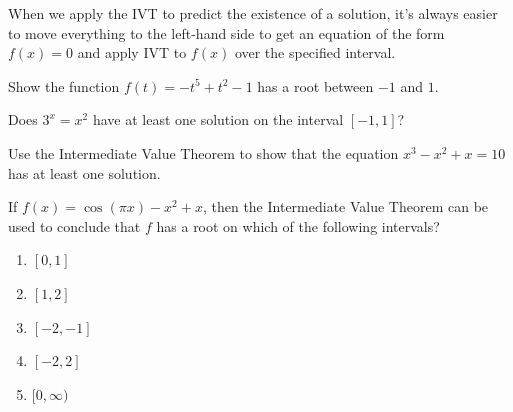 \documentclass[../main.tex]{subfiles}
\begin{document}
When we apply the IVT to predict the existence of a solution, it's always easier to move everything to the left-hand side to get an equation of the form \(f(x) = 0\) and apply IVT to \(f(x)\) over the specified interval.

\begin{example}
  Show the function \(f(t) = -t^{5} + t^{2} - 1\) has a root between \(-1\) and \(1\).
  \blanks*
\end{example}

\begin{exercise}
  Does \(3^{x} = x^{2}\) have at least one solution on the interval \([-1,1]\)?

  \blanks*
\end{exercise}
\clearpage

\begin{exercise}
  Use the Intermediate Value Theorem to show that the equation \(x^{3} - x^{2} + x = 10\) has at least one solution.

  \blanks*
\end{exercise}

\begin{exercise}
  If \(f(x) = \cos(\pi x) - x^{2} + x\), then the Intermediate Value Theorem can be used to conclude that \(f\) has a root on which of the following intervals?

  \begin{enumerate}[label={\Alph*.}]
    \item \([0, 1]\)
    \item \([1, 2]\)
    \item \([-2, -1]\)
    \item \([-2,  2]\)
    \item \([0, \infty)\)
  \end{enumerate}

\end{exercise}
\end{document}
